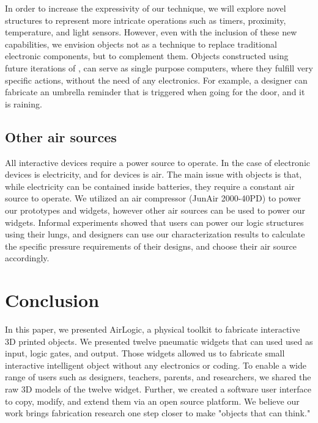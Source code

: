         In order to increase the expressivity of our technique, we will
        explore novel structures to represent more intricate operations
        such as timers, proximity, temperature, and light sensors. However,
        even with the inclusion of these new capabilities, we envision \al
        objects not as a technique to replace traditional electronic
        components, but to complement them. Objects constructed using
        future iterations of \al, can serve as single purpose computers,
        where they fulfill very specific actions, without the need of any
        electronics. For example, a designer can fabricate an umbrella
        reminder that is triggered when going for the door, and it is
        raining.

      \subsection{Other air sources}
        All interactive devices require a power source to operate. In the
        case of electronic devices is electricity, and for \al devices is
        air. The main issue with \al objects is that, while electricity can
        be contained inside batteries, they require a constant air source
        to operate. We utilized an air compressor (JunAir 2000-40PD) to
        power our prototypes and widgets, however other air sources can be
        used to power our widgets. Informal experiments showed that users can
        power our logic structures using their lungs, and designers can use our
        characterization results to calculate the specific pressure requirements
        of their designs, and choose their air source accordingly.

  \newpage
  \section{Conclusion}
    In this paper, we presented AirLogic, a physical toolkit to fabricate
    interactive 3D printed objects. We presented twelve pneumatic widgets that
    can used used as input, logic gates, and output. Those widgets allowed us to
    fabricate small interactive intelligent object without any electronics or
    coding. To enable a wide range of users such as designers, teachers,
    parents, and researchers, we shared the raw 3D models of the twelve widget.
    Further, we created a software user interface to copy, modify, and extend
    them via an open source platform. We believe our work brings fabrication
    research one step closer to make "objects that can think."